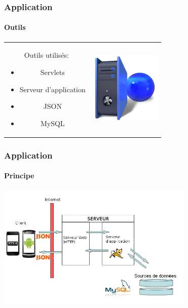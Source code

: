 \begin{frame}
\frametitle{Application}
\framesubtitle{Outils}
	\begin{center}
		\begin{tabular}{cc}
			\begin{minipage}{7cm}
			
			\begin{block}{Outils utilisés: }
				\begin{itemize}
				  \item Servlets
				  \item Serveur d'application
				  \item JSON
				  \item MySQL
				\end{itemize}
			\end{block}
			
			\end{minipage}&
			
			\begin{minipage}{4cm}
				\includegraphics[scale=0.5]{img/serveur.png} 
			\end{minipage}\\
				
			\end{tabular}
	\end{center}
			
\end{frame}


\begin{frame}
\frametitle{Application}
\framesubtitle{Principe}

	\begin{center}
		\includegraphics[width=9.4cm]{img/4.png} 
	\end{center}
	

\end{frame}
